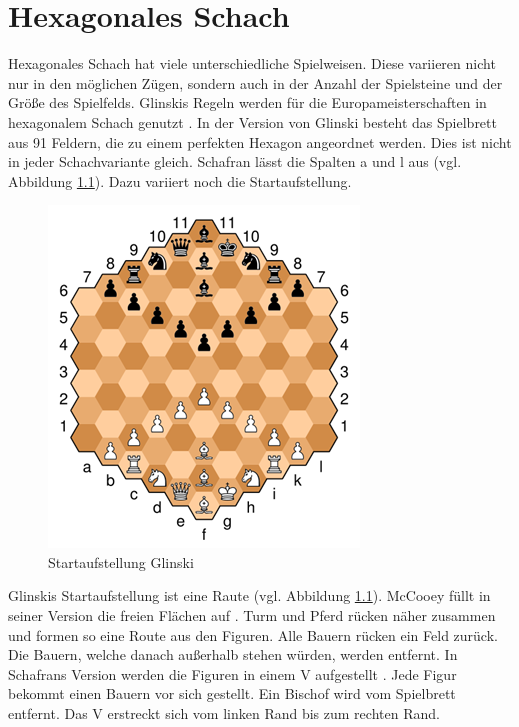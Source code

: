 \chapter{Hexagonales Schach}

Hexagonales Schach hat viele unterschiedliche Spielweisen. Diese variieren nicht nur in den möglichen Zügen, sondern auch in der Anzahl der Spielsteine und der Größe des Spielfelds. Glinskis Regeln werden für die Europameisterschaften in hexagonalem Schach genutzt \cite{Gados:Hexagonal}. In der Version von Glinski besteht das Spielbrett aus 91 Feldern, die zu einem perfekten Hexagon angeordnet werden. Dies ist nicht in jeder Schachvariante gleich. Schafran lässt die Spalten a und l aus (vgl. Abbildung \ref{fig:hex:start}). Dazu variiert noch die Startaufstellung.

\begin{figure}[H]
    \centering
    \includegraphics{images/hexStart.png}
    \caption{Startaufstellung Glinski \protect\footnotemark}
    \label{fig:hex:start}
\end{figure}

Glinskis Startaufstellung ist eine Raute \cite{GlinskiHexaChess}(vgl. Abbildung \ref{fig:hex:start}). McCooey füllt in seiner Version die freien Flächen auf \cite{McCoeeyHexaChess}. Turm und Pferd rücken näher zusammen und formen so eine Route aus den Figuren. Alle Bauern rücken ein Feld zurück. Die Bauern, welche danach außerhalb stehen würden, werden entfernt. In Schafrans Version werden die Figuren in einem V  aufgestellt \cite{SchafranHexaChess}. Jede Figur bekommt einen Bauern vor sich gestellt. Ein Bischof wird vom Spielbrett entfernt. Das V erstreckt sich vom linken Rand bis zum rechten Rand. 



